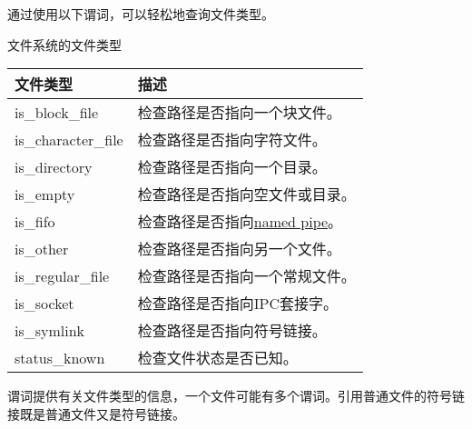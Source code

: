 通过使用以下谓词，可以轻松地查询文件类型。

\begin{center}
文件系统的文件类型
\end{center}

\begin{longtable}[c]{|l|l|}
\hline
\textbf{文件类型} & \textbf{描述}                                      \\ \hline
\endfirsthead
%
\endhead
%
is\_block\_file     & 检查路径是否指向一个块文件。               \\ \hline
is\_character\_file & 检查路径是否指向字符文件。           \\ \hline
is\_directory       & 检查路径是否指向一个目录。                \\ \hline
is\_empty           & 检查路径是否指向空文件或目录。 \\ \hline
is\_fifo            & 检查路径是否指向\href{https://en.wikipedia.org/wiki/Named_pipe}{named pipe}。               \\ \hline
is\_other           & 检查路径是否指向另一个文件。               \\ \hline
is\_regular\_file   & 检查路径是否指向一个常规文件。             \\ \hline
is\_socket          & 检查路径是否指向IPC套接字。              \\ \hline
is\_symlink         & 检查路径是否指向符号链接。            \\ \hline
status\_known       & 检查文件状态是否已知。                      \\ \hline
\end{longtable}


谓词提供有关文件类型的信息，一个文件可能有多个谓词。引用普通文件的符号链接既是普通文件又是符号链接。


